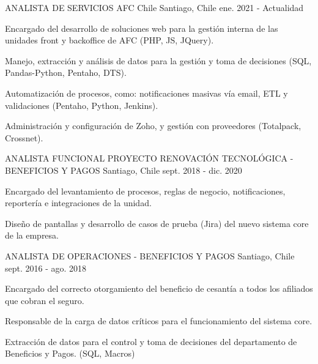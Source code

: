 

\begin{cventries}

  \cventry
    {ANALISTA DE SERVICIOS} %
    {AFC Chile} %
    {Santiago, Chile} %
    {ene. 2021 - Actualidad} %
    {
      \begin{cvitems} %
        \item {Encargado del desarrollo de soluciones web para la gestión interna de las unidades front y backoffice de AFC (PHP, JS, JQuery).} 
        \item {Manejo, extracción y análisis de datos para la gestión y toma de decisiones (SQL, Pandas-Python, Pentaho, DTS).}
        \item {Automatización de procesos, como: notificaciones masivas vía email, ETL y validaciones (Pentaho, Python, Jenkins).}
        \item {Administración y configuración de Zoho, y gestión con proveedores (Totalpack, Crossnet).}
      \end{cvitems}
    }%

  \cventry
    {ANALISTA FUNCIONAL PROYECTO RENOVACIÓN TECNOLÓGICA - BENEFICIOS Y PAGOS} %
    {} %
    {Santiago, Chile} %
    {sept. 2018 - dic. 2020} %
    {
      \begin{cvitems} %
        \item {Encargado del levantamiento de procesos, reglas de negocio, notificaciones, reportería e integraciones de la unidad.}
        \item {Diseño de pantallas y desarrollo de casos de prueba (Jira) del nuevo sistema core de la empresa.}
      \end{cvitems}
    }%

  \cventry
    {ANALISTA DE OPERACIONES - BENEFICIOS Y PAGOS} %
    {} %
    {Santiago, Chile} %
    {sept. 2016 - ago. 2018} %
    {
      \begin{cvitems} %
        \item {Encargado del correcto otorgamiento del beneficio de cesantía a todos los afiliados que cobran el seguro.}
        \item {Responsable de la carga de datos críticos para el funcionamiento del sistema core.}
        \item {Extracción de datos para el control y toma de decisiones del departamento de Beneficios y Pagos. (SQL, Macros)}
      \end{cvitems}
    }


\end{cventries}
